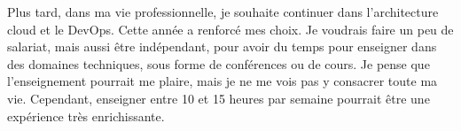 \begin{center}
    \bigskip

    Plus tard, dans ma vie professionnelle, je souhaite continuer dans l'architecture cloud et le DevOps.
    Cette année a renforcé mes choix.
    Je voudrais faire un peu de salariat, mais aussi être indépendant, pour avoir du temps pour enseigner dans des domaines techniques, sous forme de conférences ou de cours.
    Je pense que l'enseignement pourrait me plaire, mais je ne me vois pas y consacrer toute ma vie.
    Cependant, enseigner entre 10 et 15 heures par semaine pourrait être une expérience très enrichissante.

\end{center}
\clearpage